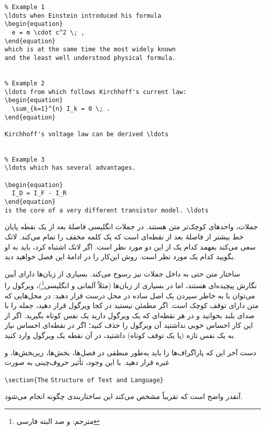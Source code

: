 \begin{code}
\begin{verbatim}
% Example 1
\ldots when Einstein introduced his formula 
\begin{equation} 
  e = m \cdot c^2 \; , 
\end{equation} 
which is at the same time the most widely known 
and the least well understood physical formula. 


% Example 2
\ldots from which follows Kirchhoff's current law:
\begin{equation} 
  \sum_{k=1}^{n} I_k = 0 \; .
\end{equation} 

Kirchhoff's voltage law can be derived \ldots


% Example 3
\ldots which has several advantages.

\begin{equation} 
  I_D = I_F - I_R
\end{equation} 
is the core of a very different transistor model. \ldots
\end{verbatim}
\end{code} 

جملات، واحدهای کوچک‌تر متن هستند. در جملات انگلیسی فاصلهٔ بعد از یک نقطه پایان خط بیشتر از فاصلهٔ بعد از نقطه‌ای است که یک کلمه مخفف را تمام می‌کند. 
لاتک سعی می‌کند بفهمد کدام یک از این دو مورد نظر است. اگر لاتک اشتباه کرد، باید به او بگویید کدام یک مورد نظر است. 
روش این‌کار را در ادامهٔ این فصل خواهید دید.

ساختار متن حتی به داخل جملات نیز رسوخ می‌کند. بسیاری از زبان‌ها دارای آیین نگارش پیچیده‌ای هستند، اما در بسیاری از زبان‌ها 
(مثلاً آلمانی و انگلیسی\footnote{مترجم: و صد البته فارسی})، 
ویرگول را می‌توان با به خاطر سپردن یک اصل ساده در محل درست قرار دهید: در محل‌هایی که متن دارای توقف کوچک است.
اگر مطمئن نیستید در کجا ویرگول قرار دهید، جمله را با صدای بلند بخوانید و در هر نقطه‌ای که یک ویرگول دارید یک نفس کوتاه بگیرید. اگر از این کار احساس خوبی نداشتید آن ویرگول را حذف کنید؛ اگر در نقطه‌ای احساس نیاز به یک نفس تازه (یا یک توقف کوتاه) داشتید، در آن نقطه یک ویرگول وارد کنید.

دست آخر این که پاراگراف‌ها را باید به‌طور منطقی در فصل‌ها، بخش‌ها، زیربخش‌ها، و غیره قرار دهید. با این وجود، تأثیر حروف‌چینی به صورت  
\begin{code}
\verb|\section{The| \texttt{Structure of Text and Language}\verb|}| 
\end{code}
آنقدر واضح است که تقریباً مشخص می‌کند این ساختاربندی چگونه انجام می‌شود.
